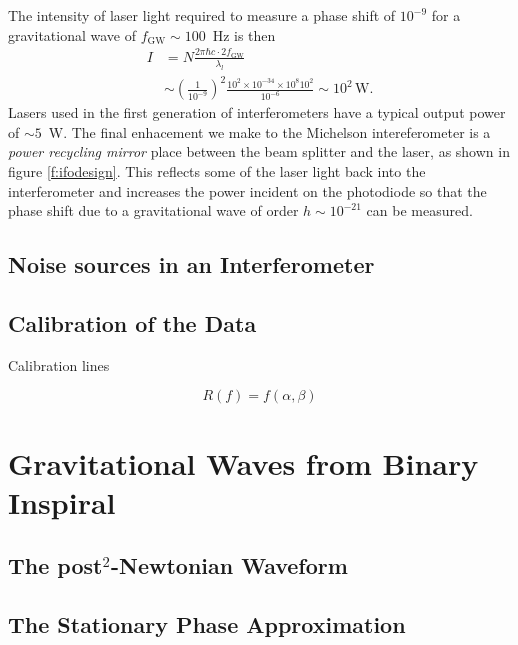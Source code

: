 The intensity of laser light required to measure a phase shift of $10^{-9}$
for a gravitational wave of $f_\mathrm{GW} \sim 100$~Hz is then
\begin{equation}
\begin{split}
I &= N \frac{2 \pi \hbar c \cdot 2f_\mathrm{GW}}{\lambda_l} \\
&\sim \left(\frac{1}{10^{-9}}\right)^2 
\frac{10^2 \times 10^{-34} \times 10^{8} 10^2 } { 10^{-6} } \sim 10^2\,
\mathrm{W}.
\end{split}
\end{equation}
Lasers used in the first generation of interferometers have a typical output
power of $\sim 5$~W. The final enhacement we make to the Michelson
intereferometer is a \emph{power recycling mirror} place between the beam
splitter and the laser, as shown in figure \ref{f:ifodesign}. This reflects
some of the laser light back into the interferometer and increases the power
incident on the photodiode so that the phase shift due to a gravitational wave
of order $h \sim 10^{-21}$ can be measured.

\subsection{Noise sources in an Interferometer}
\label{ss:noise}

\subsection{Calibration of the Data}
\label{ss:calibration}

Calibration lines

\begin{equation}
R(f) = f(\alpha,\beta)
\label{eq:calibration}
\end{equation}

\section{Gravitational Waves from Binary Inspiral}
\label{s:inspiralgw}

\subsection{The post$^2$-Newtonian Waveform}

\subsection{The Stationary Phase Approximation}
\label{ss:stationaryphase}

